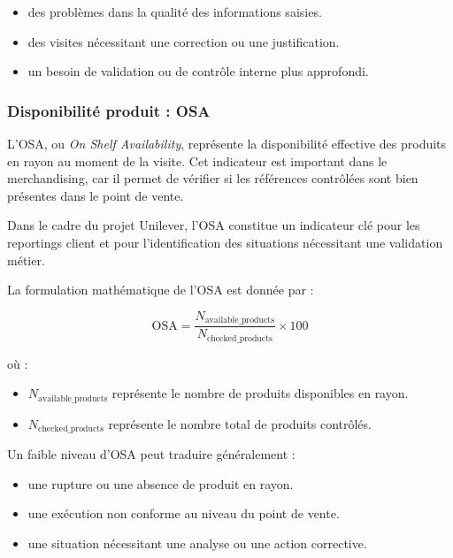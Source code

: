 \begin{itemize}
    \item des problèmes dans la qualité des informations saisies.
    \item des visites nécessitant une correction ou une justification.
    \item un besoin de validation ou de contrôle interne plus approfondi.
\end{itemize}


\subsubsection{Disponibilité produit : OSA}

L’OSA, ou \textit{On Shelf Availability}, représente la disponibilité effective des produits en rayon au moment de la visite. Cet indicateur est important dans le merchandising, car il permet de vérifier si les références contrôlées sont bien présentes dans le point de vente.

Dans le cadre du projet Unilever, l’OSA constitue un indicateur clé pour les reportings client et pour l’identification des situations nécessitant une validation métier.

La formulation mathématique de l’OSA est donnée par :

\[
\mathrm{OSA} =
\frac{N_{\mathrm{available\_products}}}
{N_{\mathrm{checked\_products}}}
\times 100
\]

où :

\begin{itemize}
    \item $N_{\mathrm{available\_products}}$ représente le nombre de produits disponibles en rayon.
    \item $N_{\mathrm{checked\_products}}$ représente le nombre total de produits contrôlés.
\end{itemize}

Un faible niveau d’OSA peut traduire généralement :

\begin{itemize}
    \item une rupture ou une absence de produit en rayon.
    \item une exécution non conforme au niveau du point de vente.
    \item une situation nécessitant une analyse ou une action corrective.
\end{itemize}

